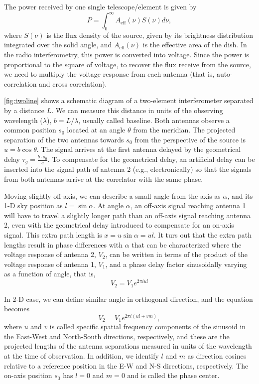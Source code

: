 The power received by one single telescope/element is given by
\begin{equation}
P = \int_{0}^{\infty} A_{\text{eff}}(\nu) S(\nu) d \nu,
\end{equation}
where $S(\nu)$ is the flux density of the source, given by its brightness distribution integrated over the solid angle, and $A_{\text{eff}}(\nu)$ is the effective area of the dish. In the radio interferometry, this power is converted into voltage. Since the power is proportional to the square of voltage, to recover the flux receive from the source, we need to multiply the voltage response from each antenna (that is, auto-correlation and cross correlation).

\autoref{fig:twoline} shows a schematic diagram of a two-element interferometer separated by a distance $L$. We can measure this distance in units of the observing wavelength ($\lambda$), $b = L/\lambda$, usually called baseline. Both antennas observe a common position $s_0$ located at an angle $\theta$ from the meridian. The projected separation of the two antennas towards $s_0$ from the perspective of the source is $u = b \cos \theta$. The signal arrives at the first antenna delayed by the geometrical delay $\tau_g = \frac{b \cdot s_0}{c}$. To compensate for the geometrical delay, an artificial delay can be inserted into the signal path of antenna 2 (e.g., electronically) so that the signals from both antennas arrive at the correlator with the same phase.

Moving slightly off-axis, we can describe a small angle from the axis as $\alpha$, and its 1-D sky position as $l = \sin \alpha$. At angle $\alpha$, an off-axis signal reaching antenna 1 will have to travel a slightly longer path than an off-axis signal reaching antenna 2, even with the geometrical delay introduced to compensate for an on-axis signal. This extra path length is $x = u \sin \alpha = ul$. It turs out that the extra path lengths result in phase differences with $\alpha$ that can be characterized where the voltage response of antenna 2, $V_2$, can be written in terms of the product of the voltage response of antenna 1, $V_1$, and a phase delay factor sinusoidally varying as a function of angle, that is,
\begin{equation}
V_2 = V_1 e^{2 \pi i u l}
\end{equation}

In 2-D case, we can define similar angle in orthogonal direction, and the equation becomes
\begin{equation}
V_2 = V_1 e^{2\pi i (ul + vm)},
\end{equation}
where $u$ and $v$ is called specific spatial frequency components of the sinusoid in the East-West and North-South directions, respectively, and these are the projected lengths of the antenna separations measured in units of the wavelength at the time of observation. In addition, we identify $l$ and $m$ as direction cosines relative to a reference position in the E-W and N-S directions, respectively. The on-axis position $s_0$ has $l = 0$ and $m = 0$ and is called the phase center.

